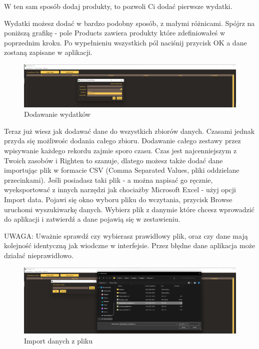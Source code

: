 \documentclass[a4paper,10pt, twoside]{report}
\begin{document}
{W ten sam sposób dodaj produkty, to pozwoli Ci dodać pierwsze wydatki.}

\medskip
{Wydatki możesz dodać w bardzo podobny sposób, z małymi różnicami. Spójrz na 
poniższą grafikę - pole Products zawiera produkty które zdefiniowałeś w 
poprzednim kroku. Po wypełnieniu wszystkich pól naciśnij przycisk OK a dane 
zostaną zapisane w aplikacji.}

\begin{figure}[H]           %
    \caption{Dodawanie wydatków}
    \label{fig:Dodawanie wydatków}
    \centering
    \includegraphics[width=12cm]{figures/Guide/Righten_Instruction_04_browse_p4_espenditures.png}
\end{figure}

{Teraz już wiesz jak dodawać dane do wszystkich zbiorów danych. Czasami jednak 
przyda się możliwośc dodania całego zbioru. Dodawanie całego zestawy przez 
wpisywanie każdego rekordu zajmie sporo czasu. Czas jest najcenniejszym z Twoich
 zasobów i Righten to szanuje, dlatego możesz także dodać dane importując plik 
w formacie CSV (Comma Separated Values, pliki oddzielane przecinkami). Jeśli 
posiadasz taki plik - a można napisać go ręcznie, wyeksportować z innych 
narzędzi jak chociażby Microsoft Excel - użyj opcji Import data. Pojawi się okno
 wyboru pliku do wczytania, przycisk Browse uruchomi wyszukiwarkę danych. 
Wybierz plik z danymie które chcesz wprowadzić do aplikacji i zatwierdź a dane 
pojawią się w zestawieniu.}

{UWAGA: Uważnie sprawdź czy wybierasz prawidłowy plik, oraz czy dane mają 
kolejność identyczną jak wiodczne w interfejsie. Przez błędne dane aplikacja 
może działać nieprawidłowo.}

\begin{figure}[H]           %
    \caption{Import danych z pliku}
    \label{fig:Import danych z pliku}
    \centering
    \includegraphics[width=12cm]{figures/Guide/Righten_Instruction_05_import-from-csv.png}
\end{figure}
\end{document}
